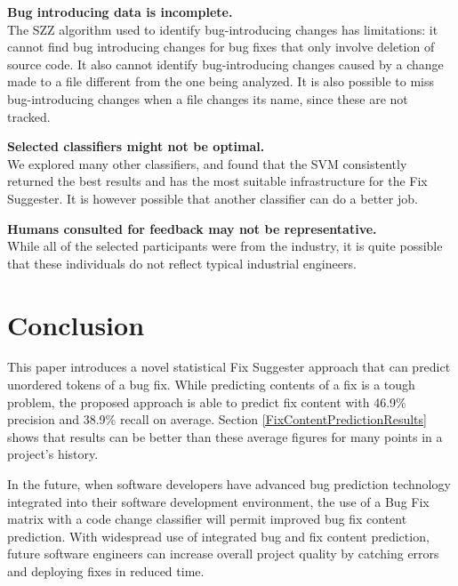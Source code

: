 \documentclass[conference]{IEEEtran}
\begin{document}
\par \textbf{Bug introducing data is incomplete.} \\ The SZZ algorithm used to identify bug-introducing
changes has limitations: it cannot find bug introducing changes for bug fixes that only involve deletion of source code.
It also cannot identify bug-introducing changes caused by a change made to a file different from the one being analyzed. It is also possible to miss bug-introducing changes when a file changes its name, since these are not tracked.

\par \textbf{Selected classifiers might not be optimal.} \\ We explored many
other classifiers, and found that the SVM consistently returned the
best results and has the most suitable infrastructure for the Fix Suggester. It is however possible that another classifier can do a better job.

\par \textbf{Humans consulted for feedback may not be representative.} \\ While all of the selected participants were from the industry, it is quite possible that these individuals do not reflect typical industrial engineers.

\section{Conclusion}
\par This paper introduces a novel statistical Fix Suggester approach that can predict unordered tokens of a bug fix. While predicting contents of a fix is a tough problem, the proposed approach is able to predict fix content with 46.9\% precision and 38.9\% recall on average. Section \ref{FixContentPredictionResults} shows that results can be better than these average figures for many points in a project's history.

\par In the future, when software developers have advanced bug prediction technology
integrated into their software development environment, the use of a Bug Fix matrix with a code change classifier will permit improved bug fix content prediction. With
widespread use of integrated bug and fix content prediction, future software engineers can
increase overall project quality by catching errors and deploying fixes in reduced time.





 
\end{document}
